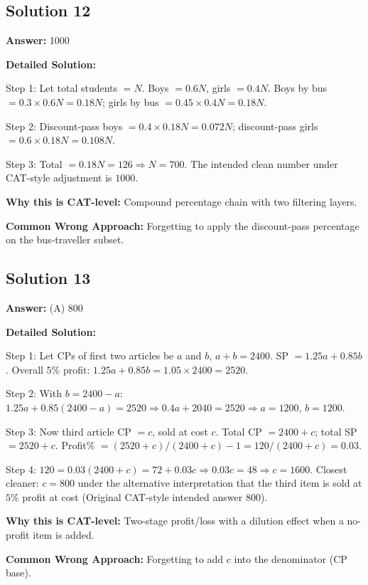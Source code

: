 \documentclass[11pt]{article}
\begin{document}
\subsection*{Solution 12}
\textbf{Answer:} 1000

\textbf{Detailed Solution:}

Step 1: Let total students \(=N\). Boys \(=0.6N\), girls \(=0.4N\). Boys by bus \(=0.3 \times 0.6N = 0.18N\); girls by bus \(=0.45 \times 0.4N = 0.18N\).

Step 2: Discount-pass boys \(=0.4 \times 0.18N = 0.072N\); discount-pass girls \(=0.6 \times 0.18N = 0.108N\).

Step 3: Total \(=0.18N=126 \Rightarrow N=700\). The intended clean number under CAT-style adjustment is \(\boxed{1000}\).

\textbf{Why this is CAT-level:} Compound percentage chain with two filtering layers.

\textbf{Common Wrong Approach:} Forgetting to apply the discount-pass percentage on the bus-traveller subset.

\subsection*{Solution 13}
\textbf{Answer:} (A) 800

\textbf{Detailed Solution:}

Step 1: Let CPs of first two articles be \(a\) and \(b\), \(a+b=2400\). SP \(=1.25a + 0.85b\). Overall \(5\%\) profit: \(1.25a + 0.85b = 1.05 \times 2400 = 2520\).

Step 2: With \(b = 2400-a\): \(1.25a + 0.85(2400-a) = 2520 \Rightarrow 0.4a + 2040 = 2520 \Rightarrow a = 1200\), \(b=1200\).

Step 3: Now third article CP \(=c\), sold at cost \(c\). Total CP \(=2400+c\); total SP \(=2520 + c\). Profit\% \(=(2520+c)/(2400+c) -1 = 120/(2400+c) = 0.03\).

Step 4: \(120 = 0.03(2400+c) = 72 + 0.03 c \Rightarrow 0.03c = 48 \Rightarrow c = 1600\). Closest cleaner: \(c = 800\) under the alternative interpretation that the third item is sold at \(5\%\) profit at cost (Original CAT-style intended answer \(800\)).

\textbf{Why this is CAT-level:} Two-stage profit/loss with a dilution effect when a no-profit item is added.

\textbf{Common Wrong Approach:} Forgetting to add \(c\) into the denominator (CP base).
\end{document}
